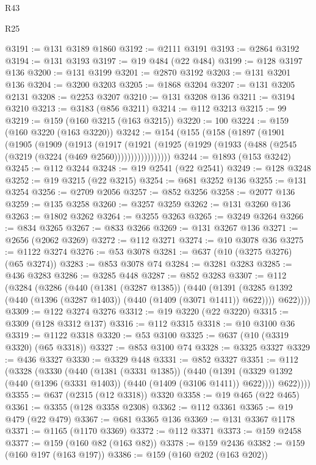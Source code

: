\begin{lexlean}{R43}
\begin{lexlean}{R25}
\begin{coremodule}
{{{{{{{{{{{{{{{{{{{{{{{{{{{{{{{{{{{{{{{{{{{{{{{{{{{{{{{{{{{{{{{{{{{{{{{{{{{{{{{{{{{{{{{{{{{{{{{{{{{{{{{{{{{{{{{{{{{{{{{{{{{{{{{{{{{{{{{{{{{{{{{{{{{{{{{{{{{{{{{{{{{{{{{{{{{{{{{{{{{{{{{{{{{{{{{{{@3191 := @131 @3189 @1860
@3192 := @2111 @3191
@3193 := @2864 @3192
@3194 := @131 @3193
@3197 := @19 @484 (@22 @484)
@3199 := @128 @3197 @136
@3200 := @131 @3199
@3201 := @2870 @3192
@3203 := @131 @3201 @136
@3204 := @3200 @3203
@3205 := @1868 @3204
@3207 := @131 @3205 @2131
@3208 := @2253 @3207
@3210 := @131 @3208 @136
@3211 := @3194 @3210
@3213 := @3183 (@856 @3211)
@3214 := @112 @3213
@3215 := 99
@3219 := @159 (@160 @3215 (@163 @3215))
@3220 := 100
@3224 := @159 (@160 @3220 (@163 @3220))
@3242 := @154
    (@155
      (@158
        (@1897
          (@1901
            (@1905
              (@1909
                (@1913
                  (@1917
                    (@1921
                      (@1925 (@1929 (@1933 (@488 (@2545 (@3219 (@3224 (@469 @2560)))))))))))))))))
@3244 := @1893 (@153 @3242)
@3245 := @112 @3244
@3248 := @19 @2541 (@22 @2541)
@3249 := @128 @3248
@3252 := @19 @3215 (@22 @3215)
@3254 := @681 @3252 @136
@3255 := @131 @3254
@3256 := @2709 @2056
@3257 := @852 @3256
@3258 := @2077 @136
@3259 := @135 @3258
@3260 := @3257 @3259
@3262 := @131 @3260 @136
@3263 := @1802 @3262
@3264 := @3255 @3263
@3265 := @3249 @3264
@3266 := @834 @3265
@3267 := @833 @3266
@3269 := @131 @3267 @136
@3271 := @2656 (@2062 @3269)
@3272 := @112 @3271
@3274 := @10 @3078 @36
@3275 := @1122 @3274
@3276 := @53 @3078
@3281 := @637 (@10 (@3275 @3276) (@65 @3274))
@3283 := @853 @3078 @74
@3284 := @3281 @3283
@3285 := @436 @3283
@3286 := @3285 @448
@3287 := @852 @3283
@3307 := @112
    (@3284
      (@3286
        (@440
          (@1381 (@3287 @1385))
          (@440
            (@1391 (@3285 @1392 (@440 (@1396 (@3287 @1403)) (@440 (@1409 (@3071 @1411)) @622))))
            @622))))
@3309 := @122 @3274 @3276
@3312 := @19 @3220 (@22 @3220)
@3315 := @3309 (@128 @3312 @137)
@3316 := @112 @3315
@3318 := @10 @3100 @36
@3319 := @1122 @3318
@3320 := @53 @3100
@3325 := @637 (@10 (@3319 @3320) (@65 @3318))
@3327 := @853 @3100 @74
@3328 := @3325 @3327
@3329 := @436 @3327
@3330 := @3329 @448
@3331 := @852 @3327
@3351 := @112
    (@3328
      (@3330
        (@440
          (@1381 (@3331 @1385))
          (@440
            (@1391 (@3329 @1392 (@440 (@1396 (@3331 @1403)) (@440 (@1409 (@3106 @1411)) @622))))
            @622))))
@3355 := @637 (@2315 (@12 @3318)) @3320
@3358 := @19 @465 (@22 @465)
@3361 := @3355 (@128 @3358 @2308)
@3362 := @112 @3361
@3365 := @19 @479 (@22 @479)
@3367 := @681 @3365 @136
@3369 := @131 @3367 @1178
@3371 := @1165 (@1170 @3369)
@3372 := @112 @3371
@3373 := @159 @2458
@3377 := @159 (@160 @82 (@163 @82))
@3378 := @159 @2436
@3382 := @159 (@160 @197 (@163 @197))
@3386 := @159 (@160 @202 (@163 @202))
}}}}}}}}}}}}}}}}}}}}}}}}}}}}}}}}}}}}}}}}}}}}}}}}}}}}}}}}}}}}}}}}}}}}}}}}}}}}}}}}}}}}}}}}}}}}}}}}}}}}}}}}}}}}}}}}}}}}}}}}}}}}}}}}}}}}}}}}}}}}}}}}}}}}}}}}}}}}}}}}}}}}}}}}}}}}}}}}}}}}}}}}}}}}}}}}}
\end{coremodule}
\end{lexlean}
\end{lexlean}
